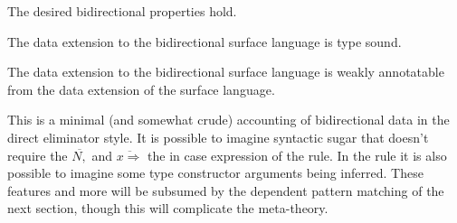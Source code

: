 The desired bidirectional properties hold.
\begin{claim}
The data extension to the bidirectional surface language is type sound.
\end{claim}

\begin{claim}
The data extension to the bidirectional surface language is weakly annotatable from the data extension of the surface language.
\end{claim}

This is a minimal (and somewhat crude) accounting of bidirectional data in the direct eliminator style.
It is possible to imagine syntactic sugar that doesn't require the $\overline{N,}$ and $\overline{x\Rightarrow}$ the in case expression of the  rule.
In the rule  it is also possible to imagine some type constructor arguments being inferred.
These features and more will be subsumed by the dependent pattern matching of the next section, though this will complicate the meta-theory.
